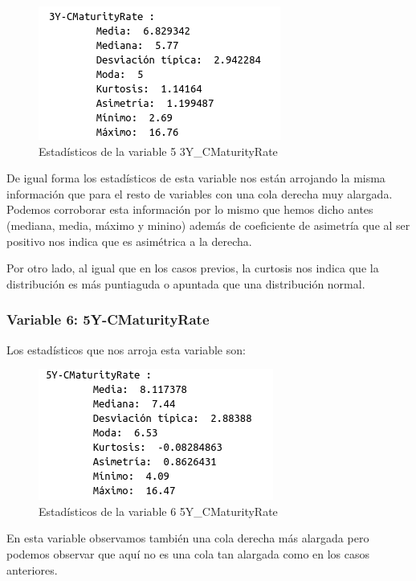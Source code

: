 \documentclass[12pt,a4paper]{article}
\begin{document}
\begin{figure}[H]
	\centering
	\includegraphics[scale=0.7]{./Imagenes/EDA/Regresion/estadisticos_3Y_CMaturityRate.png}
	\caption{Estadísticos de la variable 5 3Y\_CMaturityRate}
\end{figure}

De igual forma los estadísticos de esta variable nos están arrojando la misma información que para el resto de variables con una cola derecha muy alargada. Podemos corroborar esta información por lo mismo que hemos dicho antes (mediana, media, máximo y minino) además de coeficiente de asimetría que al ser positivo nos indica que es asimétrica a la derecha.

Por otro lado, al igual que en los casos previos, la curtosis nos indica que la distribución es más puntiaguda o apuntada que una distribución normal.

\subsubsection*{Variable 6: 5Y-CMaturityRate}

Los estadísticos que nos arroja esta variable son:

\begin{figure}[H]
	\centering
	\includegraphics[scale=0.7]{./Imagenes/EDA/Regresion/estadisticos_5Y_CMaturityRate.png}
	\caption{Estadísticos de la variable 6 5Y\_CMaturityRate}
\end{figure}

En esta variable observamos también una cola derecha más alargada pero podemos observar que aquí no es una cola tan alargada como en los casos anteriores. 
\end{document}
